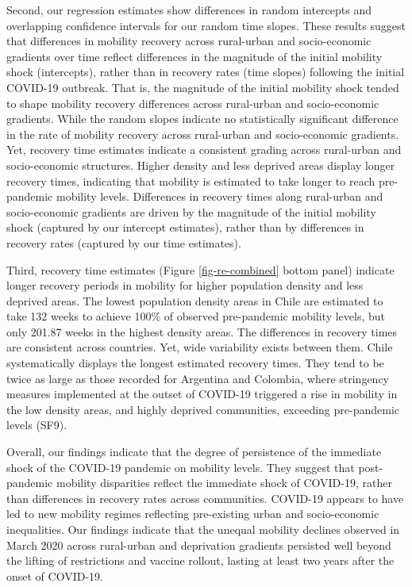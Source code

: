 \documentclass[fleqn,10pt]{wlscirep}
\begin{document}
Second, our regression estimates show differences in random intercepts and overlapping confidence intervals for our random time slopes. These results suggest that differences in mobility recovery across rural-urban and socio-economic gradients over time reflect differences in the magnitude of the initial mobility shock (intercepts), rather than in recovery rates (time slopes) following the initial COVID-19 outbreak. That is, the magnitude of the initial mobility shock tended to shape mobility recovery differences across rural-urban and socio-economic gradients. While the random slopes indicate no statistically significant difference in the rate of mobility recovery across rural-urban and socio-economic gradients. Yet, recovery time estimates indicate a consistent grading across rural-urban and socio-economic structures. Higher density and less deprived areas display longer recovery times,
indicating that mobility is estimated to take longer to reach pre-pandemic mobility levels. Differences in recovery times along rural-urban and socio-economic gradients are driven by the magnitude of the initial mobility shock (captured by our intercept estimates), rather than by differences in recovery rates (captured by our time estimates).

Third, recovery time estimates (Figure \ref{fig-re-combined} bottom panel) indicate longer recovery periods in mobility for higher population density and less deprived areas. The lowest population density areas in Chile are estimated to take 132 weeks to achieve 100\% of observed pre-pandemic mobility levels, but only 201.87 weeks in the highest density areas. The differences in recovery times are consistent across countries. Yet, wide variability exists between them. Chile systematically displays the longest estimated recovery times. They tend to be twice as large as those recorded for Argentina and Colombia, where stringency measures implemented at the outset of COVID-19 triggered a rise in mobility in the low density areas, and highly deprived communities, exceeding pre-pandemic levels (SF9).

Overall, our findings indicate that the degree of persistence of the immediate shock of the COVID-19 pandemic on mobility
levels. They suggest that post-pandemic mobility disparities reflect the immediate shock of COVID-19, rather than differences in recovery rates across communities. COVID-19 appears to have led to new mobility regimes reflecting pre-existing urban and socio-economic inequalities. Our findings indicate that the unequal mobility declines observed in March 2020 across rural-urban and deprivation gradients persisted well beyond the lifting of restrictions and vaccine rollout, lasting at least two years after the onset of COVID-19.
\end{document}
